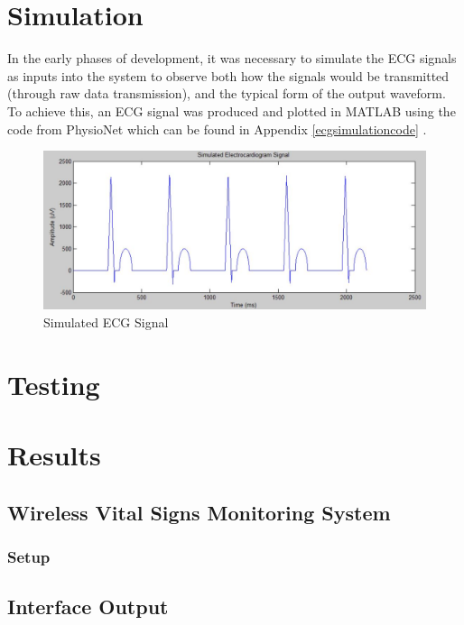 
\chapter{Simulation}
\label{simulation}

In the early phases of development, it was necessary to simulate the ECG signals as inputs into the system to observe both how the signals would be transmitted (through raw data transmission), and the typical form of the output waveform. To achieve this, an ECG signal was produced and plotted in MATLAB using the code from PhysioNet which can be found in Appendix \ref{ecgsimulationcode} \cite{ecgsimulation}.

\begin{figure}[H]
	\centering
	\includegraphics[width=\linewidth]{ecgsim.jpg}
	\caption{Simulated ECG Signal}
	\label{ecgsim}
\end{figure} 

\chapter{Testing}


\chapter{Results}

\section{Wireless Vital Signs Monitoring System}

\subsection{Setup}

\section{Interface Output}



